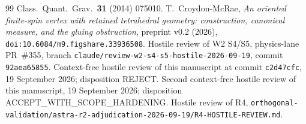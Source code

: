 \documentclass[11pt]{article}
\numberwithin{equation}{section}
\theoremstyle{definition}
\theoremstyle{remark}
\begin{document}
\begin{thebibliography}{99}
Class.\ Quant.\ Grav.\ \textbf{31} (2014) 075010.
 T.~Croydon-McRae,
\emph{An oriented finite-spin vertex with retained tetrahedral geometry:
construction, canonical measure, and the gluing obstruction},
preprint v0.2 (2026), \texttt{doi:10.6084/m9.figshare.33936508}.
 Hostile review of W2 S4/S5, physics-lane PR~\#355, branch
\texttt{claude/review-w2-s4-s5-hostile-2026-09-19}, commit \texttt{92aea65855}.
 Context-free hostile review of this manuscript at commit
\texttt{c2d47cfc}, 19 September 2026; disposition REJECT.
 Second context-free hostile review of this manuscript,
19 September 2026; disposition ACCEPT\_WITH\_SCOPE\_HARDENING.
 Hostile review of R4,
\texttt{orthogonal-validation/astra-r2-adjudication-2026-09-19/R4-HOSTILE-REVIEW.md}.
\end{thebibliography}
\end{document}
